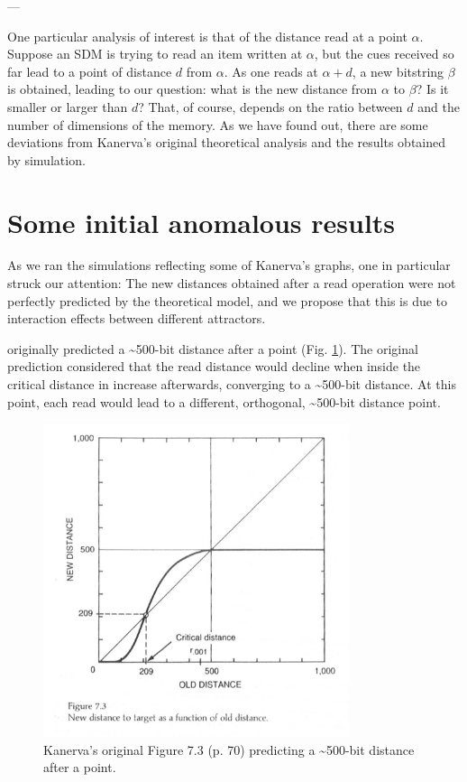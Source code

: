 ---

One particular analysis of interest is that of the distance read at a point $\alpha$. Suppose an SDM is trying to read an item written at $\alpha$, but the cues received so far lead to a point of distance $d$ from $\alpha$.  As one reads at $\alpha+d$, a new bitstring $\beta$ is obtained, leading to our question: what is the new distance from $\alpha$ to $\beta$? Is it smaller or larger than $d$? That, of course, depends on the ratio between $d$ and the number of dimensions of the memory.  As we have found out, there are some deviations from Kanerva's original theoretical analysis and the results obtained by simulation.

\section{Some initial anomalous results}

As we ran the simulations reflecting some of Kanerva's graphs, one in particular struck our attention: The new distances obtained after a read operation were not perfectly predicted by the theoretical model, and we propose that this is due to interaction effects between different attractors.

\citet{Kanerva1988} originally predicted a \textasciitilde 500-bit distance after a point (Fig. \ref{kanerva-table-7-2}). The original prediction considered that the read distance would decline when inside the critical distance in increase afterwards, converging to a \textasciitilde 500-bit distance.  At this point, each read would lead to a different, orthogonal, \textasciitilde 500-bit distance point.

\begin{figure}[h]
\centering\includegraphics[width=0.8\textwidth]{images02/kanerva-table-7-2-original.png}
\caption{Kanerva's original Figure 7.3 (p. 70) predicting a \textasciitilde 500-bit distance after a point.
\label{kanerva-table-7-2}}
\end{figure}


